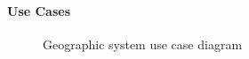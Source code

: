 ﻿\documentclass{article}
\begin{document}
\paragraph{Use Cases}

\begin{figure}[H]
    \centering
    \begin{center}
    \end{center}
    \caption{Geographic system use case diagram}
    \label{fig:my_label}
\end{figure}
\pagebreak
\end{document}
